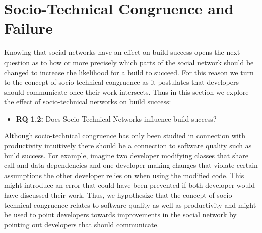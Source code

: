 \section{Socio-Technical Congruence and Failure}
\label{chap:stc-net2}
Knowing that social networks have an effect on build success opens the next question as to how or more precisely which parts of the social network should be changed to increase the likelihood for a build to succeed.
For this reason we turn to the concept of socio-technical congruence as it postulates that developers should communicate once their work intersects.
Thus in this section we explore the effect of socio-technical networks on build success:

\begin{itemize}
  \item\textbf{RQ 1.2:} Does Socio-Technical Networks influence build success?
\end{itemize}

Although socio-technical congruence has only been studied in connection with productivity intuitively there should be a connection to software quality such as build success.
For example, imagine two developer modifying classes that share call and data dependencies and one developer making changes that violate certain assumptions the other developer relies on when using the modified code.
This might introduce an error that could have been prevented if both developer would have discussed their work.
Thus, we hypothesize that the concept of socio-technical congruence relates to software quality as well as productivity and might be used to point developers towards improvements in the social network by pointing out developers that should communicate.




